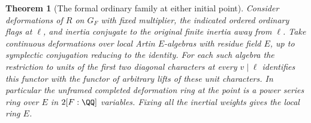 \documentclass[a4paper,11pt]{article}
\newtheorem{theorem}[proposition]{Theorem}
\theoremstyle{definition}
\theoremstyle{remark}
\numberwithin{equation}{section}
\begin{document}
\begin{theorem}[The formal ordinary family at either initial point]
\leavevmode\label{thm:seedweight580}
Consider deformations of \(R\) on \(G_F\) with fixed multiplier,
the indicated ordered ordinary flags at \(\ell\), and inertia
conjugate to the original finite inertia away from \(\ell\).
Take continuous deformations over local Artin \(E\)-algebras
with residue field \(E\), up to symplectic conjugation reducing
to the identity. For each such algebra the restriction to units
of the first two diagonal characters at every \(v\mid\ell\)
identifies this functor with the functor of arbitrary lifts of
these unit characters. In particular the unframed completed
deformation ring at the point is a power series ring over \(E\)
in \(2[F:\QQ]\) variables. Fixing all the inertial weights gives
the local ring \(E\).
\end{theorem}
\end{document}
